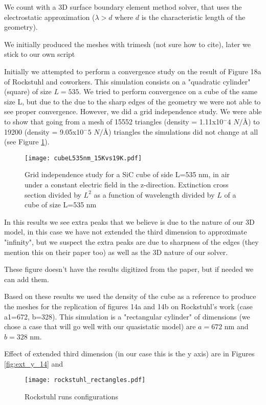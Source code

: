 We count with a 3D surface boundary element method solver, that uses the electrostatic approximation
($\lambda > d$ where $d$ is the characteristic length of the geometry). 

{\color{red}We initially produced the meshes with trimesh (not sure how to cite), later we stick to 
our own script}

Initially we attempted to perform a convergence study on the result of Figure 18a
of Rockstuhl and coworkers. This simulation consists on a "quadratic cylinder" (square)
of size $L=535$. We tried to perform convergence on a cube of the same size L, but
due to the due to the sharp edges of the geometry we were not able to see proper convergence. 
However, we did a grid independence study. We were able to show that going from a mesh of 15552 
triangles (density = 1.11x10$^-4$ $N/\text{\AA}$) to 19200 (density = 9.05x10$^-5$ $N/\text{\AA}$) 
triangles the simulations did not change at all (see Figure \ref{fig:cube535}).  

\begin{figure}
    \centering
    \texttt{[image: cubeL535nm\_15Kvs19K.pdf]} 
    \caption{Grid independence study for a SiC cube of side L=535 nm, in air under a constant 
    electric field in the z-direction. Extinction cross section divided by $L^2$ as a function of wavelength divided 
    by $L$ of a cube of size L=535 nm}
    \label{fig:cube535}
 \end{figure}

In this results we see extra peaks that we believe is due to the nature of our 3D model, in this case 
we have not extended the third dimension to approximate "infinity", but we suspect the extra peaks are 
due to sharpness of the edges (they mention this on their paper too) as well as the 3D nature of our solver.

These figure doesn't have the results digitized from the paper, but if needed we can add them. 

Based on these results we used the density of the cube as a reference to produce the meshes for the replication 
of figures 14a and 14b on Rockstuhl's work (case a1=672, b=328). This simulation is a "rectangular cylinder" of 
dimensions (we chose a case that will go well with our quasistatic model) are $a=672$ nm and $b=328$ nm. 

Effect of extended third dimension (in our case this is the y axis) are in Figures \ref{fig:ext_y_14} and


\begin{figure}
    \centering
    \texttt{[image: rockstuhl\_rectangles.pdf]} 
    \caption{Rockstuhl runs configurations}
    \label{fig:rectangle_sketch}
\end{figure}

